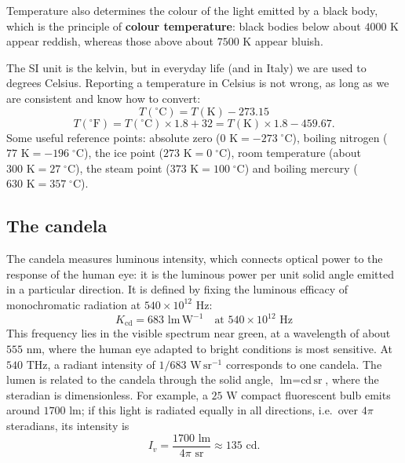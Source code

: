 \documentclass[letterpaper,11pt,leqno]{book}
\begin{document}
Temperature also determines the colour of the light emitted by a black body, which is the principle of \textbf{colour temperature}: black bodies below about $4000\text{ K}$ appear reddish, whereas those above about $7500\text{ K}$ appear bluish.

The SI unit is the kelvin, but in everyday life (and in Italy) we are used to degrees Celsius. Reporting a temperature in Celsius is not wrong, as long as we are consistent and know how to convert:
\begin{equation}
\boxed{T(^\circ\text{C}) = T(\text{K}) - 273.15}
\label{eq:celsius_conversion}
\end{equation}
\begin{equation}
T(^\circ\text{F}) = T(^\circ\text{C}) \times 1.8 + 32 = T(\text{K}) \times 1.8 - 459.67.
\label{eq:fahrenheit_conversion}
\end{equation}
Some useful reference points: absolute zero ($0\text{ K} = -273\;^\circ\text{C}$), boiling nitrogen ($77\text{ K} = -196\;^\circ\text{C}$), the ice point ($273\text{ K} = 0\;^\circ\text{C}$), room temperature (about $300\text{ K} = 27\;^\circ\text{C}$), the steam point ($373\text{ K} = 100\;^\circ\text{C}$) and boiling mercury ($630\text{ K} = 357\;^\circ\text{C}$).

\subsection{The candela}

The candela measures luminous intensity, which connects optical power to the response of the human eye: it is the luminous power per unit solid angle emitted in a particular direction. It is defined by fixing the luminous efficacy of monochromatic radiation at $540 \times 10^{12}\text{ Hz}$:
\begin{equation}
\boxed{K_{\text{cd}} = 683\text{ lm}\,\text{W}^{-1} \quad \text{at } 540 \times 10^{12}\text{ Hz}}
\label{eq:candela_def}
\end{equation}
This frequency lies in the visible spectrum near green, at a wavelength of about $555\text{ nm}$, where the human eye adapted to bright conditions is most sensitive. At $540\text{ THz}$, a radiant intensity of $1/683\text{ W}\,\text{sr}^{-1}$ corresponds to one candela. The lumen is related to the candela through the solid angle, $\text{lm} = \text{cd}\,\text{sr}$, where the steradian is dimensionless. For example, a $25\text{ W}$ compact fluorescent bulb emits around $1700\text{ lm}$; if this light is radiated equally in all directions, i.e.\ over $4\pi$ steradians, its intensity is
\begin{equation}
I_v = \frac{1700\text{ lm}}{4\pi\text{ sr}} \approx 135\text{ cd}.
\label{eq:candela_calc_example}
\end{equation}
\end{document}
